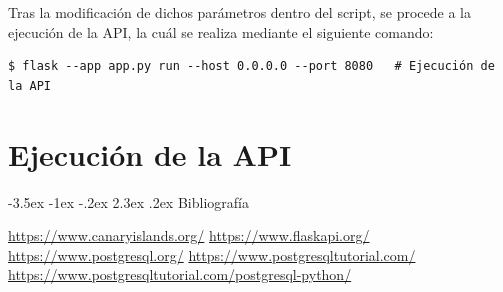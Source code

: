 \documentclass[11pt]{report}
\makeatletter
\renewcommand\chapter{\@startsection{chapter}{0}{\z@}%
    {-3.5ex \@plus -1ex \@minus -.2ex}%
    {2.3ex \@plus.2ex}%
    {\normalfont\Large\bfseries}}
\makeatother
\begin{document}
Tras la modificación de dichos parámetros dentro del script, se procede a la ejecución de la API, la cuál se realiza mediante el siguiente comando:

\begin{verbatim}
$ flask --app app.py run --host 0.0.0.0 --port 8080   # Ejecución de la API
\end{verbatim}

\section{Ejecución de la API}


\chapter{Bibliografía}
\begin{thebibliography}{99}
       \url{https://www.canaryislands.org/}
       \url{https://www.flaskapi.org/}
       \url{https://www.postgresql.org/}
       \url{https://www.postgresqltutorial.com/}
       \url{https://www.postgresqltutorial.com/postgresql-python/}

\end{thebibliography}
\end{document}
